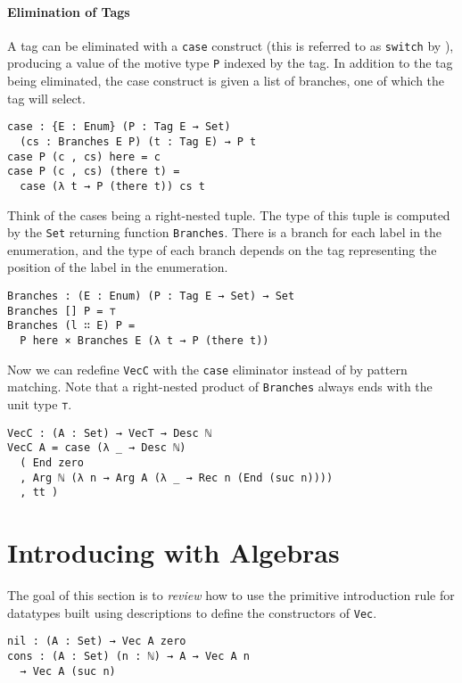 \documentclass[preprint,nonatbib]{sigplanconf}
\begin{document}
\paragraph{Elimination of Tags}

A tag can be eliminated with a {\tt case} construct (this is referred to
as {\tt switch} by \citet{Chapman:2010:GAL:1932681.1863547,dagand:phd}),
producing a value of the motive type {\tt P} indexed by the tag.
In addition to the tag being eliminated, the case construct is given a
list of branches, one of which the tag will select.

\begin{verbatim}
case : {E : Enum} (P : Tag E → Set)
  (cs : Branches E P) (t : Tag E) → P t
case P (c , cs) here = c
case P (c , cs) (there t) =
  case (λ t → P (there t)) cs t
\end{verbatim}

Think of the cases being a right-nested tuple. The type of this tuple
is computed by the {\tt Set} returning function {\tt Branches}.
There is a branch for each label in the enumeration, and the type of
each branch depends on the tag representing the position of the label
in the enumeration.

\begin{verbatim}
Branches : (E : Enum) (P : Tag E → Set) → Set
Branches [] P = ⊤
Branches (l ∷ E) P =
  P here × Branches E (λ t → P (there t))
\end{verbatim}

Now we can redefine {\tt VecC} with the {\tt case} eliminator instead
of by pattern matching. Note that a right-nested product of
{\tt Branches} always ends with the unit type {\tt ⊤}.

\begin{verbatim}
VecC : (A : Set) → VecT → Desc ℕ
VecC A = case (λ _ → Desc ℕ)
  ( End zero
  , Arg ℕ (λ n → Arg A (λ _ → Rec n (End (suc n))))
  , tt )
\end{verbatim}

\section{Introducing with Algebras}
\label{sec:init}

The goal of this section is to {\it review} how to use the primitive
introduction rule for datatypes built using descriptions to define the
constructors of {\tt Vec}.

\begin{verbatim}
nil : (A : Set) → Vec A zero
cons : (A : Set) (n : ℕ) → A → Vec A n
  → Vec A (suc n)
\end{verbatim}
\end{document}
